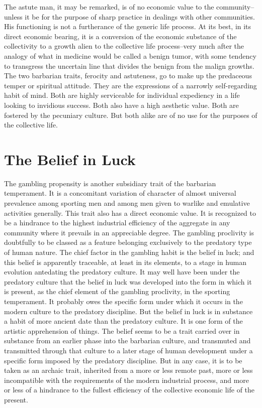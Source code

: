 \documentclass[12pt]{report}
\begin{document}
The astute man, it may be remarked, is of no economic value to the
community--unless it be for the purpose of sharp practice in dealings
with other communities. His functioning is not a furtherance of the
generic life process. At its best, in its direct economic bearing, it is
a conversion of the economic substance of the collectivity to a growth
alien to the collective life process--very much after the analogy of
what in medicine would be called a benign tumor, with some tendency to
transgress the uncertain line that divides the benign from the malign
growths. The two barbarian traits, ferocity and astuteness, go to make
up the predaceous temper or spiritual attitude. They are the expressions
of a narrowly self-regarding habit of mind. Both are highly serviceable
for individual expediency in a life looking to invidious success. Both
also have a high aesthetic value. Both are fostered by the pecuniary
culture. But both alike are of no use for the purposes of the collective
life.




\chapter{The Belief in Luck}
The gambling propensity is another subsidiary trait of the barbarian
temperament. It is a concomitant variation of character of almost
universal prevalence among sporting men and among men given to warlike
and emulative activities generally. This trait also has a direct
economic value. It is recognized to be a hindrance to the highest
industrial efficiency of the aggregate in any community where it
prevails in an appreciable degree. The gambling proclivity is doubtfully
to be classed as a feature belonging exclusively to the predatory type
of human nature. The chief factor in the gambling habit is the belief in
luck; and this belief is apparently traceable, at least in its elements,
to a stage in human evolution antedating the predatory culture. It may
well have been under the predatory culture that the belief in luck was
developed into the form in which it is present, as the chief element of
the gambling proclivity, in the sporting temperament. It probably owes
the specific form under which it occurs in the modern culture to the
predatory discipline. But the belief in luck is in substance a habit
of more ancient date than the predatory culture. It is one form of the
artistic apprehension of things. The belief seems to be a trait carried
over in substance from an earlier phase into the barbarian culture,
and transmuted and transmitted through that culture to a later stage
of human development under a specific form imposed by the predatory
discipline. But in any case, it is to be taken as an archaic trait,
inherited from a more or less remote past, more or less incompatible
with the requirements of the modern industrial process, and more or less
of a hindrance to the fullest efficiency of the collective economic life
of the present.
\end{document}
